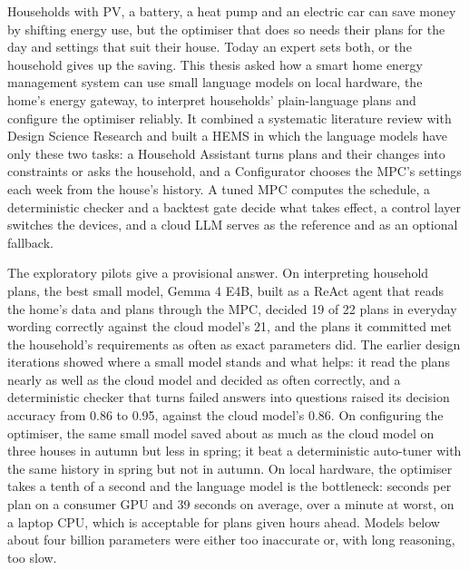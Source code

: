 Households with PV, a battery, a heat pump and an electric car can save
money by shifting energy use, but the optimiser that does so needs
their plans for the day and settings that suit their house. Today an
expert sets both, or the household gives up the saving. This thesis
asked how a smart home energy management system can use small language
models on local hardware, the home's energy gateway, to interpret
households' plain-language plans and configure the optimiser reliably.
It combined a
systematic literature review with Design Science Research and built a
HEMS in which the language models have only these two tasks: a
Household Assistant turns plans and their changes into constraints or
asks the household, and a Configurator chooses the MPC's settings each
week from the house's history. A tuned MPC computes the schedule, a
deterministic checker and a backtest gate decide what takes effect, a
control layer switches the devices, and a cloud LLM serves as the
reference and as an optional fallback.

The exploratory pilots give a provisional answer. On interpreting
household plans, the best small model, Gemma 4 E4B, built as a ReAct
agent that reads the home's data and plans through the MPC, decided 19
of 22 plans in everyday wording correctly against the cloud model's 21,
and the plans it committed met the household's requirements as often
as exact parameters did. The earlier design iterations showed where a
small model stands and what helps: it read the plans nearly as well as
the cloud model and decided as often correctly, and a deterministic
checker that turns failed answers into questions raised its decision
accuracy from 0.86 to 0.95, against the cloud model's 0.86. On configuring the
optimiser, the same small model saved about as much as the cloud model
on three houses in autumn but less in spring; it beat a deterministic
auto-tuner with the same history in spring but not in autumn. On local hardware, the optimiser takes a tenth of a
second and the language model is the bottleneck: seconds per plan on a
consumer GPU and 39 seconds on average, over a minute at worst, on a
laptop CPU, which is acceptable for
plans given hours ahead. Models below about four billion parameters
were either too inaccurate or, with long reasoning, too slow.

